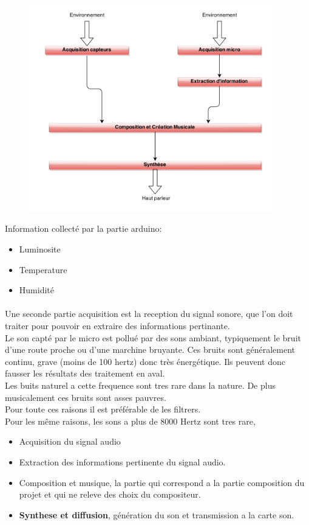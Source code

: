 \documentclass[a4paper, titlepage, oneside, 12pt]{article}%
\begin{document}
\begin{figure}
  \centering
  \includegraphics[width=400px]{structprojet.jpg}
\end{figure}

Information collecté par la partie arduino:
\begin{itemize}
\item Luminosite
\item Temperature
\item Humidité
\end{itemize}

\paragraph{}
Une seconde partie acquisition est la reception du signal sonore, que l'on doit traiter pour pouvoir en extraire des informations pertinante.\\
Le son capté par le micro est pollué par des sons ambiant, typiquement le bruit d'une route proche ou d'une marchine bruyante. Ces bruits sont généralement continu, grave (moins  de 100 hertz) donc très énergétique. Ils peuvent donc fausser les résultats des traitement en aval.\\
 Les buits naturel a cette frequence sont tres rare dans la nature. De plus musicalement ces bruits sont asses pauvres.\\
 Pour toute ces raisons il est préférable de les filtrers.\\
 
 Pour les même raisons, les sons a plus de 8000 Hertz sont tres rare, 



\begin{itemize}
\item Acquisition du signal audio
\item Extraction des informations pertinente du signal audio.
\item Composition et musique, la partie qui correspond a la partie composition du projet et qui ne releve des choix du compositeur.
\item \textbf{Synthese et diffusion}, génération du son et transmission a la carte son.
\end{itemize}
\end{document}
